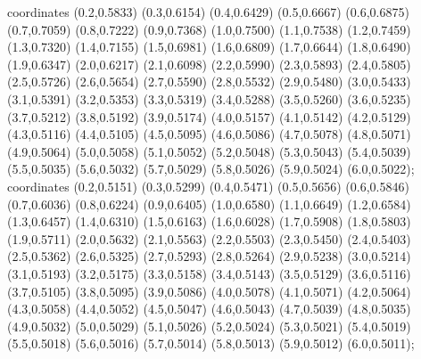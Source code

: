  coordinates {(0.2,0.5833) (0.3,0.6154) (0.4,0.6429) (0.5,0.6667) (0.6,0.6875) (0.7,0.7059) (0.8,0.7222) (0.9,0.7368) (1.0,0.7500) (1.1,0.7538) (1.2,0.7459) (1.3,0.7320) (1.4,0.7155) (1.5,0.6981) (1.6,0.6809) (1.7,0.6644) (1.8,0.6490) (1.9,0.6347) (2.0,0.6217) (2.1,0.6098) (2.2,0.5990) (2.3,0.5893) (2.4,0.5805) (2.5,0.5726) (2.6,0.5654) (2.7,0.5590) (2.8,0.5532) (2.9,0.5480) (3.0,0.5433) (3.1,0.5391) (3.2,0.5353) (3.3,0.5319) (3.4,0.5288) (3.5,0.5260) (3.6,0.5235) (3.7,0.5212) (3.8,0.5192) (3.9,0.5174) (4.0,0.5157) (4.1,0.5142) (4.2,0.5129) (4.3,0.5116) (4.4,0.5105) (4.5,0.5095) (4.6,0.5086) (4.7,0.5078) (4.8,0.5071) (4.9,0.5064) (5.0,0.5058) (5.1,0.5052) (5.2,0.5048) (5.3,0.5043) (5.4,0.5039) (5.5,0.5035) (5.6,0.5032) (5.7,0.5029) (5.8,0.5026) (5.9,0.5024) (6.0,0.5022)};
 coordinates {(0.2,0.5151) (0.3,0.5299) (0.4,0.5471) (0.5,0.5656) (0.6,0.5846) (0.7,0.6036) (0.8,0.6224) (0.9,0.6405) (1.0,0.6580) (1.1,0.6649) (1.2,0.6584) (1.3,0.6457) (1.4,0.6310) (1.5,0.6163) (1.6,0.6028) (1.7,0.5908) (1.8,0.5803) (1.9,0.5711) (2.0,0.5632) (2.1,0.5563) (2.2,0.5503) (2.3,0.5450) (2.4,0.5403) (2.5,0.5362) (2.6,0.5325) (2.7,0.5293) (2.8,0.5264) (2.9,0.5238) (3.0,0.5214) (3.1,0.5193) (3.2,0.5175) (3.3,0.5158) (3.4,0.5143) (3.5,0.5129) (3.6,0.5116) (3.7,0.5105) (3.8,0.5095) (3.9,0.5086) (4.0,0.5078) (4.1,0.5071) (4.2,0.5064) (4.3,0.5058) (4.4,0.5052) (4.5,0.5047) (4.6,0.5043) (4.7,0.5039) (4.8,0.5035) (4.9,0.5032) (5.0,0.5029) (5.1,0.5026) (5.2,0.5024) (5.3,0.5021) (5.4,0.5019) (5.5,0.5018) (5.6,0.5016) (5.7,0.5014) (5.8,0.5013) (5.9,0.5012) (6.0,0.5011)};
